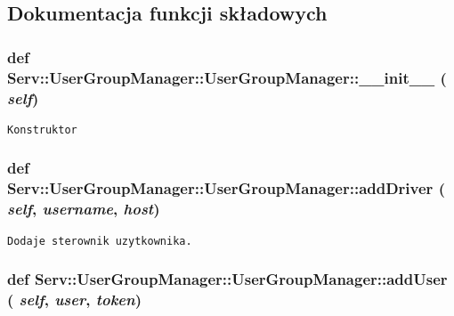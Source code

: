 \subsection{Dokumentacja funkcji składowych}
\hypertarget{class_serv_1_1_user_group_manager_1_1_user_group_manager_f43f9798f1e93dd8425699ecd6de6c87}{
\subsubsection[{\_\-\_\-init\_\-\_\-}]{\setlength{\rightskip}{0pt plus 5cm}def Serv::UserGroupManager::UserGroupManager::\_\-\_\-init\_\-\_\- ( {\em self})}}
\label{class_serv_1_1_user_group_manager_1_1_user_group_manager_f43f9798f1e93dd8425699ecd6de6c87}




\footnotesize\begin{verbatim}Konstruktor\end{verbatim}
\normalsize
 \hypertarget{class_serv_1_1_user_group_manager_1_1_user_group_manager_ea0f7f8d1d6e4d5efce31f3d0ea35fd9}{
\subsubsection[{addDriver}]{\setlength{\rightskip}{0pt plus 5cm}def Serv::UserGroupManager::UserGroupManager::addDriver ( {\em self}, \/   {\em username}, \/   {\em host})}}
\label{class_serv_1_1_user_group_manager_1_1_user_group_manager_ea0f7f8d1d6e4d5efce31f3d0ea35fd9}




\footnotesize\begin{verbatim}Dodaje sterownik uzytkownika.\end{verbatim}
\normalsize
 \hypertarget{class_serv_1_1_user_group_manager_1_1_user_group_manager_46ee225566738a93c7c036b464a931fb}{
\subsubsection[{addUser}]{\setlength{\rightskip}{0pt plus 5cm}def Serv::UserGroupManager::UserGroupManager::addUser ( {\em self}, \/   {\em user}, \/   {\em token})}}
\label{class_serv_1_1_user_group_manager_1_1_user_group_manager_46ee225566738a93c7c036b464a931fb}




